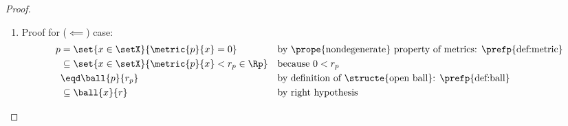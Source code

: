 \begin{proof}
\begin{enumerate}

  \item Proof for ($\impliedby$) case:
    \begin{align*}
      p &=    \set{x\in\setX}{\metric{p}{x}=0}
        &&    \text{by \prope{nondegenerate} property of metrics: \prefp{def:metric}}
      \\&\subseteq \set{x\in\setX}{\metric{p}{x}<r_p\in\Rp}
        &&    \text{because $0<r_p$}
      \\&\eqd \ball{p}{r_p}
        &&    \text{by definition of \structe{open ball}: \prefp{def:ball}}
      \\&\subseteq \ball{x}{r}
        &&    \text{by right hypothesis}
    \end{align*}

\end{enumerate}

\end{proof}



